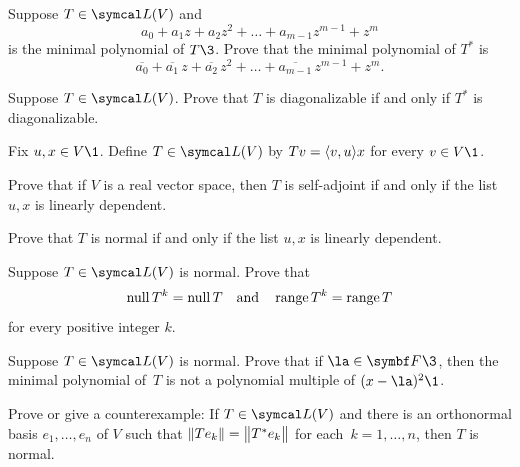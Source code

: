 \begin{exercises}
\exercise
Suppose $T \in \L(V)$ and\label{7minpoly}
\[
a_0 + a_1 z + a_2 z^2 + \dots + a_{m-1} z^{m-1} + z^m
\]
is the minimal polynomial of $T\3$. Prove that the minimal polynomial of $T^*$ is
\[
\overline{a_0} + \overline{a_1}\, z + \overline{a_2} \,z^2 + \dots + \overline{a_{m-1}} \,z^{m-1} + z^m\!.
\]
\exercisedisplayend
{}


\exercise
Suppose $T \in \L(V)$. Prove that $T$ is diagonalizable if and only if $T^*$ is diagonalizable.


\exercise
Fix $u, x \in V\1$. Define $T \in \L(V)$ by
$
Tv = \ip{v, u}x$
for every $v \in V\1$.
\begin{subtheorem}
\item
Prove that if $V$ is a real vector space, then $T$ is self-adjoint if and only if the list $u, x$ is linearly dependent.
\item
Prove that $T$ is normal if and only if the list $u, x$ is linearly dependent.
\end{subtheorem}
\exercisesubtheoremend


\exercise
Suppose $T\in \L(V)$ is normal. Prove that \label{399}
\[
\ker T^k = \ker T \andd \ran T^k = \ran T
\]
for every positive integer $k$.


\exercise
Suppose $T \in \L(V)$ is normal. Prove that if $\la \in \F{}\3$, then the minimal polynomial of~$T$ is not a polynomial multiple of $(x-\la)^2\1$.

\exercise
Prove or give a counterexample: If $T \in \L(V)$ and there is an orthonormal basis $e_1, \dots, e_n$ of $V$ such that
$\|Te_k\| = \norm[\big]{T^* e_k}$ for each~$k= 1, \ldots, n$, then $T$ is normal.

\end{exercises}
